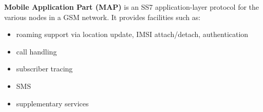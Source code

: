 \textbf{Mobile Application Part (MAP)} is an SS7 application-layer protocol 
for the various nodes in a GSM network.
 It provides facilities such as:
  \begin{itemize}[noitemsep,topsep=0pt,parsep=0pt,partopsep=0pt]
   \item roaming support via location update, IMSI attach/detach, 
   authentication
   \item call handling
   \item subscriber tracing
   \item SMS
   \item supplementary services
  \end{itemize}



